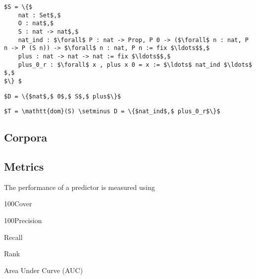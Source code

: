 \begin{lstlisting}[language=Coq, mathescape, frame=none]
$S = \{$
	nat : Set$,$
	O : nat$,$
	S : nat -> nat$,$
	nat_ind : $\forall$ P : nat -> Prop, P 0 -> ($\forall$ n : nat, P n -> P (S n)) -> $\forall$ n : nat, P n := fix $\ldots$$,$
	plus : nat -> nat -> nat := fix $\ldots$$,$
	plus_0_r : $\forall$ x , plus x 0 = x := $\ldots$ nat_ind $\ldots$ $,$
$\} $
\end{lstlisting}

\begin{lstlisting}[language=Coq, mathescape, frame=none]
$D = \{$nat$,$ 0$,$ S$,$ plus$\}$
\end{lstlisting}

\begin{lstlisting}[language=Coq, mathescape, frame=none]
$T = \mathtt{dom}(S) \setminus D = \{$nat_ind$,$ plus_0_r$\}$
\end{lstlisting}

\subsection{Corpora}
\begin{description}
    \item[\compcert]
    \item[\formalin]
    \item[\corn]
    \item[\mathcomp]
\end{description}

\subsection{Metrics}
The performance of a predictor is measured using 

\begin{definition}{100Cover}
\end{definition}

\begin{definition}{100Precision}
\end{definition}

\begin{definition}{Recall}
\end{definition}

\begin{definition}{Rank}
\end{definition}

\begin{definition}{Area Under Curve (AUC)}
\end{definition}

